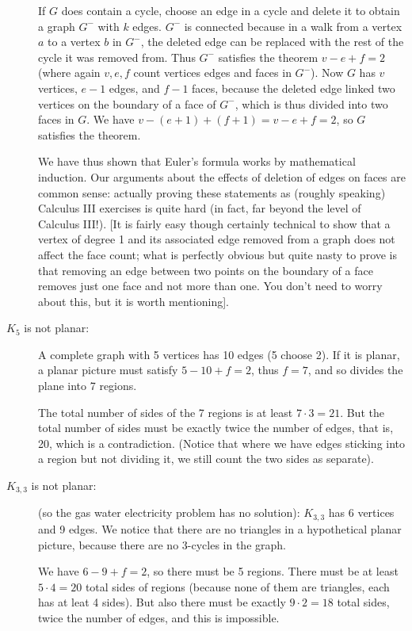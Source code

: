 \documentclass[12pt]{article}
\begin{document}
\begin{description}
If $G$ does contain a cycle, choose an edge in a cycle and delete it to obtain a graph $G^-$ with $k$ edges.  $G^-$ is connected because in a walk from a vertex $a$ to a vertex $b$ in $G^-$, the deleted edge can be replaced with the rest of the cycle it was removed from.  Thus $G^-$ satisfies the theorem $v-e+f=2$ (where again $v,e,f$ count vertices edges and faces in $G^-$).  Now $G$ has $v$ vertices, $e-1$ edges, and $f-1$ faces, because the deleted edge linked two vertices on the boundary of a face of $G^-$, which is thus divided into two faces in $G$.  We have $v -(e+1)+(f+1) = v-e+f =2$, so $G$ satisfies the theorem.

We have thus shown that Euler's formula works by mathematical induction.  Our arguments about the effects of deletion of edges on faces are common sense:  actually proving these statements as (roughly speaking) Calculus III exercises is quite hard (in fact, far beyond the level of Calculus III!).  [It is fairly easy though certainly technical to show that a vertex of degree 1 and its associated edge removed from a graph does not affect the face count;  what is perfectly obvious but quite nasty to prove is that removing an edge between two points on the boundary of a face removes just one face and not more than one.  You don't need to worry about this, but it is worth mentioning].

\item[$K_5$ is not planar:]  A complete graph with 5 vertices has 10 edges (5 choose 2).  If it is planar, a planar picture must satisfy $5-10+f = 2$, thus $f=7$, and so divides the plane into 7 regions.

The total number of sides of the 7 regions is at least $7\cdot 3 = 21$.  But the total number of sides must be exactly twice the number of edges, that is, 20, which is a contradiction.  (Notice that where we have edges sticking into a region but not dividing it, we still count the two sides as separate).

\item[$K_{3,3}$ is not planar:]  (so the gas water electricity problem has no solution):  $K_{3,3}$ has 6 vertices and 9 edges.  We notice that there are no triangles in a hypothetical planar picture, because there are no 3-cycles in the graph.

We have $6-9+f = 2$, so there must be 5 regions.  There must be at least $5 \cdot 4=20$ total sides of regions (because none of them are triangles, each has at leat 4 sides).  But also there must be exactly $9 \cdot 2 = 18$ total sides, twice the number of edges, and this is impossible.


\end{description}
\end{document}
